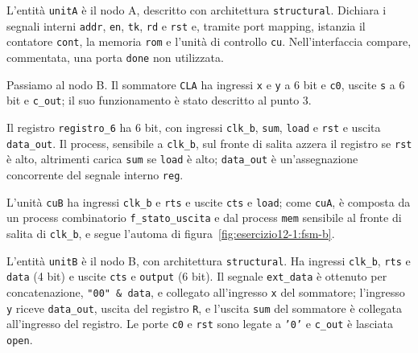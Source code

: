 
L'entità \texttt{unitA} è il nodo A, descritto con architettura \texttt{structural}. Dichiara i segnali interni \texttt{addr}, \texttt{en}, \texttt{tk}, \texttt{rd} e \texttt{rst} e, tramite port mapping, istanzia il contatore \texttt{cont}, la memoria \texttt{rom} e l'unità di controllo \texttt{cu}. Nell'interfaccia compare, commentata, una porta \texttt{done} non utilizzata.


Passiamo al nodo B. Il sommatore \texttt{CLA} ha ingressi \texttt{x} e \texttt{y} a 6 bit e \texttt{c0}, uscite \texttt{s} a 6 bit e \texttt{c\_out}; il suo funzionamento è stato descritto al punto 3.


Il registro \texttt{registro\_6} ha 6 bit, con ingressi \texttt{clk\_b}, \texttt{sum}, \texttt{load} e \texttt{rst} e uscita \texttt{data\_out}. Il process, sensibile a \texttt{clk\_b}, sul fronte di salita azzera il registro se \texttt{rst} è alto, altrimenti carica \texttt{sum} se \texttt{load} è alto; \texttt{data\_out} è un'assegnazione concorrente del segnale interno \texttt{reg}.


L'unità \texttt{cuB} ha ingressi \texttt{clk\_b} e \texttt{rts} e uscite \texttt{cts} e \texttt{load}; come \texttt{cuA}, è composta da un process combinatorio \texttt{f\_stato\_uscita} e dal process \texttt{mem} sensibile al fronte di salita di \texttt{clk\_b}, e segue l'automa di figura~\ref{fig:esercizio12-1:fsm-b}.


L'entità \texttt{unitB} è il nodo B, con architettura \texttt{structural}. Ha ingressi \texttt{clk\_b}, \texttt{rts} e \texttt{data} (4 bit) e uscite \texttt{cts} e \texttt{output} (6 bit). Il segnale \texttt{ext\_data} è ottenuto per concatenazione, \texttt{"00" \& data}, e collegato all'ingresso \texttt{x} del sommatore; l'ingresso \texttt{y} riceve \texttt{data\_out}, uscita del registro \texttt{R}, e l'uscita \texttt{sum} del sommatore è collegata all'ingresso del registro. Le porte \texttt{c0} e \texttt{rst} sono legate a \texttt{'0'} e \texttt{c\_out} è lasciata \texttt{open}.

